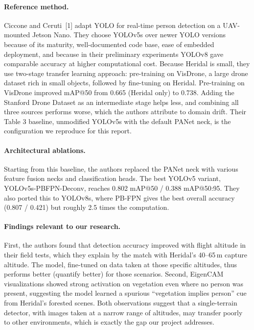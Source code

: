 \documentclass{article}
\begin{document}
\paragraph{Reference method.} Ciccone and Ceruti~[1] adapt YOLO for real-time person detection on a UAV-mounted Jetson Nano. They choose YOLOv5s over newer YOLO versions because of its maturity, well-documented code base, ease of embedded deployment, and because in their preliminary experiments YOLOv8 gave comparable accuracy at higher computational cost. Because Heridal is small, they use two-stage transfer learning approach: pre-training on VisDrone, a large drone dataset rich in small objects, followed by fine-tuning on Heridal. Pre-training on VisDrone improved mAP@50 from 0.665 (Heridal only) to 0.738. Adding the Stanford Drone Dataset as an intermediate stage helps less, and combining all three sources performs worse, which the authors attribute to domain drift. Their Table 3 baseline, unmodified YOLOv5s with the default PANet neck, is the configuration we reproduce for this report.
 
\paragraph{Architectural ablations.} Starting from this baseline, the authors replaced the PANet neck with various feature fusion necks and classification heads. The best YOLOv5 variant, YOLOv5s-PBFPN-Deconv, reaches 0.802 mAP@50 / 0.388 mAP@50:95. They also ported this to YOLOv8s, where PB-FPN gives the best overall accuracy (0.807 / 0.421) but roughly 2.5 times the computation.
 
\paragraph{Findings relevant to our research.} First, the authors found that detection accuracy improved with flight altitude in their field tests, which they explain by the match with Heridal's 40--65\,m capture altitude. The model, fine-tuned on data taken at those specific altitudes, thus performs better (quantify better) for those scenarios. Second, EigenCAM visualizations showed strong activation on vegetation even where no person was present, suggesting the model learned a spurious ``vegetation implies person'' cue from Heridal's forested scenes. Both observations suggest that a single-terrain detector, with images taken at a narrow range of altitudes, may transfer poorly to other environments, which is exactly the gap our project addresses.
\end{document}
